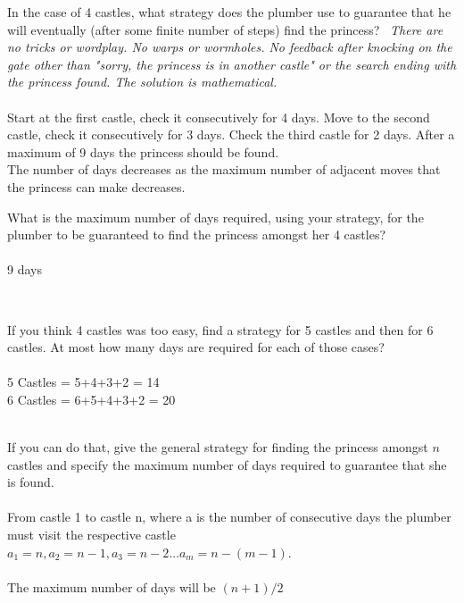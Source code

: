 \documentclass{article}
\theoremstyle{definition}
\begin{document}
\noindent
\begin{compactenum}
\item In the case of 4 castles, what strategy does the plumber use to guarantee that he will eventually (after some finite number of steps) find the princess? \ \textit{There are no tricks or wordplay.  No warps or wormholes.  No feedback after knocking on the gate other than "sorry, the princess is in another castle" or the search ending with the princess found.  The solution is mathematical.}\ \\
\ \\
Start at the first castle, check it consecutively for 4 days. Move to the second castle, check it consecutively for 3 days. Check the third castle for 2 days. After a maximum of 9 days the princess should be found.
\ \\
The number of days decreases as the maximum number of adjacent moves that the princess can make decreases.
\ \\
\item What is the maximum number of days required, using your strategy, for the plumber to be guaranteed to find the princess amongst her 4 castles?\ \\
\ \\
9 days

\ \\
\item If you think 4 castles was too easy, find a strategy for 5 castles and then for 6 castles.  At most how many days are required for each of those cases?\ \\
\ \\
5 Castles = 5+4+3+2 = 14\ \\
6 Castles = 6+5+4+3+2 = 20\ \\
\ \\
\item If you can do that, give the general strategy for finding the princess amongst $n$ castles and specify the maximum number of days required to guarantee that she is found.\ \\
\ \\
From castle 1 to castle n, where a is the number of consecutive days the plumber must visit the respective castle $a_1 = n, a_2 = n-1, a_3 = n-2 \dots a_m = n-(m-1)$.\ \\
\ \\
The maximum number of days will be $(n+1)/2$\ \\

\ \\
\end{compactenum}
\end{document}

